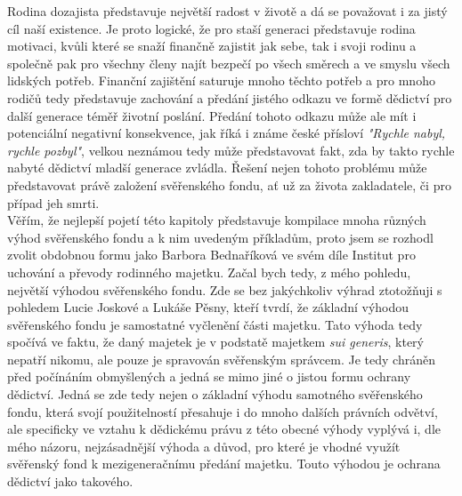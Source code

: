 \documentclass{article}
\begin{document}
 Rodina dozajista představuje největší radost v životě a dá se považovat i za jistý cíl naší existence. Je proto logické, že pro staší generaci představuje rodina motivaci, kvůli které se snaží finančně zajistit jak sebe, tak i svoji rodinu a společně pak pro všechny členy najít bezpečí po všech směrech a ve smyslu všech lidských potřeb. Finanční zajištění saturuje mnoho těchto potřeb a pro mnoho rodičů tedy představuje zachování a předání jistého odkazu ve formě dědictví pro další generace téměř životní poslání. Předání tohoto odkazu může ale mít i potenciální negativní konsekvence, jak říká i známe české přísloví \textit{"Rychle nabyl, rychle pozbyl"}, velkou neznámou tedy může představovat fakt, zda by takto rychle nabyté dědictví mladší generace zvládla. Řešení nejen tohoto problému může představovat právě založení svěřenského fondu, ať už za života zakladatele, či pro případ jeh smrti.\\
 
 Věřím, že nejlepší pojetí této kapitoly představuje kompilace mnoha různých výhod svěřenského fondu a k nim uvedeným příkladům, proto jsem se rozhodl zvolit obdobnou formu jako Barbora Bednaříková ve svém díle Institut pro uchování a převody rodinného majetku. Začal bych tedy, z mého pohledu, největší výhodou svěřenského fondu. Zde se bez jakýchkoliv výhrad ztotožňuji s pohledem Lucie Joskové a Lukáše Pěsny, kteří tvrdí, že základní výhodou svěřenského fondu je samostatné vyčlenění části majetku. Tato výhoda tedy spočívá ve faktu, že daný majetek je v podstatě majetkem \textit{sui generis}, který nepatří nikomu, ale pouze je spravován svěřenským správcem. Je tedy chráněn před počínáním obmyšlených a jedná se mimo jiné o jistou formu ochrany dědictví. Jedná se zde tedy nejen o základní výhodu samotného svěřenského fondu, která svojí použitelností přesahuje i do mnoho dalších právních odvětví, ale specificky ve vztahu k dědickému právu z této obecné výhody vyplývá i, dle mého názoru, nejzásadnější výhoda a důvod, pro které je vhodné využít svěřenský fond k mezigeneračnímu předání majetku. Touto výhodou je ochrana dědictví jako takového.\\
 
 
 
 
\end{document}
